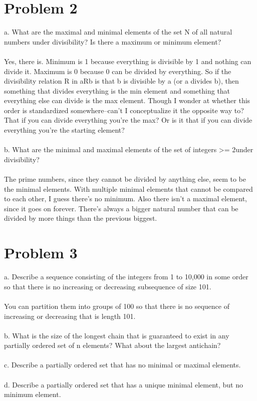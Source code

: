 \documentclass{article}
\begin{document}
\section{Problem 2}
a. What are the maximal and minimal elements of the set N of all natural numbers under divisibility? Is there a maximum or minimum element? 
\\\\
Yes, there is. Minimum is 1 because everything is divisible by 1 and nothing can divide it. Maximum is 0 because 0 can be divided by everything. So if the divisibility relation R in aRb is that b is divisible by a (or a divides b), then something that divides everything is the min element and something that everything else can divide is the max element. Though I wonder at whether this order is standardized somewhere--can't I conceptualize it the opposite way to? That if you can divide everything you're the max? Or is it that if you can divide everything you're the starting element? 
\\\\
b. What are the minimal and maximal elements of the set of integers >= 2under divisibility?
\\\\
The prime numbers, since they cannot be divided by anything else, seem to be the minimal elements. With multiple minimal elements that cannot be compared to each other, I guess there's no minimum. Also there isn't a maximal element, since it goes on forever. There's always a bigger natural number that can be divided by more things than the previous biggest. 

\section {Problem 3}
a. Describe a sequence consisting of the integers from 1 to 10,000 in some order so
that there is no increasing or decreasing subsequence of size 101.
\\\\
You can partition them into groups of 100 so that there is no sequence of increasing or decreasing that is length 101. 
\\\\
b. What is the size of the longest chain that is guaranteed to exist in any partially ordered set of n elements? What about the largest antichain?
\\\\
c. Describe a partially ordered set that has no minimal or maximal elements.
\\\\
d. Describe a partially ordered set that has a unique minimal element, but no minimum element.
\\\\
\end{document}
